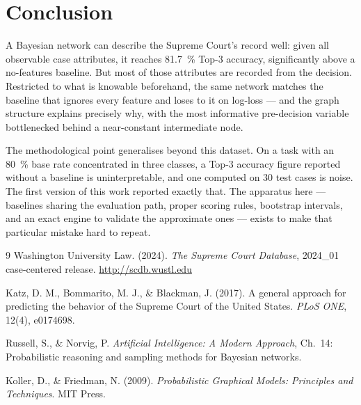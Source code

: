 \documentclass[11pt]{article}
\begin{document}
\section{Conclusion}

A Bayesian network can describe the Supreme Court's record well: given all
observable case attributes, it reaches \SI{81.7}{\percent} Top-3 accuracy,
significantly above a no-features baseline. But most of those attributes are
recorded from the decision. Restricted to what is knowable beforehand, the same
network matches the baseline that ignores every feature and loses to it on
log-loss --- and the graph structure explains precisely why, with the most
informative pre-decision variable bottlenecked behind a near-constant
intermediate node.

The methodological point generalises beyond this dataset. On a task with an
\SI{80}{\percent} base rate concentrated in three classes, a Top-3 accuracy
figure reported without a baseline is uninterpretable, and one computed on 30
test cases is noise. The first version of this work reported exactly that. The
apparatus here --- baselines sharing the evaluation path, proper scoring rules,
bootstrap intervals, and an exact engine to validate the approximate ones ---
exists to make that particular mistake hard to repeat.

\begin{thebibliography}{9}
Washington University Law. (2024). \emph{The Supreme Court Database},
2024\_01 case-centered release. \url{http://scdb.wustl.edu}

Katz, D. M., Bommarito, M. J., \& Blackman, J. (2017). A general approach for
predicting the behavior of the Supreme Court of the United States.
\emph{PLoS ONE}, 12(4), e0174698.

Russell, S., \& Norvig, P. \emph{Artificial Intelligence: A Modern Approach},
Ch.~14: Probabilistic reasoning and sampling methods for Bayesian networks.

Koller, D., \& Friedman, N. (2009). \emph{Probabilistic Graphical Models:
Principles and Techniques}. MIT Press.
\end{thebibliography}
\end{document}
